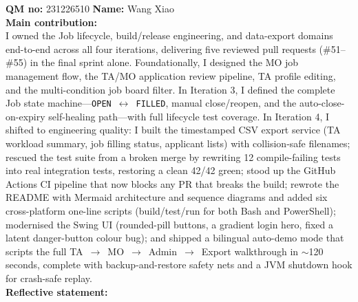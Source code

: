 \documentclass[12pt, a4paper]{article}
\begin{document}
\vspace{1.5em}
\textbf{QM no:} 231226510 \hspace{2em} \textbf{Name:} Wang Xiao\\
\textbf{Main contribution:}\\
I owned the Job lifecycle, build/release engineering, and data-export domains end-to-end across all four iterations, delivering five reviewed pull requests (\#51--\#55) in the final sprint alone. Foundationally, I designed the MO job management flow, the TA/MO application review pipeline, TA profile editing, and the multi-condition job board filter. In Iteration 3, I defined the complete Job state machine---\texttt{OPEN}~$\leftrightarrow$~\texttt{FILLED}, manual close/reopen, and the auto-close-on-expiry self-healing path---with full lifecycle test coverage. In Iteration 4, I shifted to engineering quality: I built the timestamped CSV export service (TA workload summary, job filling status, applicant lists) with collision-safe filenames; rescued the test suite from a broken merge by rewriting 12 compile-failing tests into real integration tests, restoring a clean 42/42 green; stood up the GitHub Actions CI pipeline that now blocks any PR that breaks the build; rewrote the README with Mermaid architecture and sequence diagrams and added six cross-platform one-line scripts (build/test/run for both Bash and PowerShell); modernised the Swing UI (rounded-pill buttons, a gradient login hero, fixed a latent danger-button colour bug); and shipped a bilingual auto-demo mode that scripts the full TA~$\rightarrow$~MO~$\rightarrow$~Admin~$\rightarrow$~Export walkthrough in $\sim$120 seconds, complete with backup-and-restore safety nets and a JVM shutdown hook for crash-safe replay.\\
\textbf{Reflective statement:}\\
\end{document}
